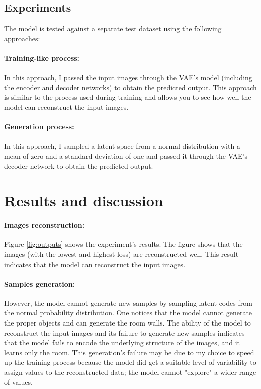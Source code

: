 \documentclass[11pt,a4paper]{article}
\begin{document}
\subsection{Experiments}

The model is tested against a separate test dataset using the following approaches:

\paragraph{Training-like process:} In this approach, I passed the input images through the VAE's model (including the encoder and decoder networks) to obtain the predicted output. This approach is similar to the process used during training and allows you to see how well the model can reconstruct the input images.

\paragraph{Generation process:} In this approach, I sampled a latent space from a normal distribution with a mean of zero and a standard deviation of one and passed it through the VAE's decoder network to obtain the predicted output.

\section{Results and discussion}

\paragraph{Images reconstruction:} Figure \ref{fig:outputs} shows the experiment's results. The figure shows that the images (with the lowest and highest loss) are reconstructed well. This result indicates that the model can reconstruct the input images. 

\paragraph{Samples generation:} However, the model cannot generate new samples by sampling latent codes from the normal probability distribution. One notices that the model cannot generate the proper objects and can generate the room walls. The ability of the model to reconstruct the input images and its failure to generate new samples indicates that the model fails to encode the underlying structure of the images, and it learns only the room. This generation's failure may be due to my choice to speed up the training process because the model did get a suitable level of variability to assign values to the reconstructed data; the model cannot "explore" a wider range of values. 
\end{document}
